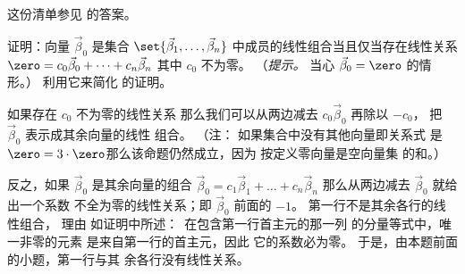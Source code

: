 \begin{exercises}
\begin{answer}
      这份清单参见  的答案。 
    \end{answer}
  \item  
     \begin{exparts}
          \partsitem 证明：向量 $\vec{\beta}_0$ 是集合 $\set{\vec{\beta}_1,\ldots,\vec{\beta}_n}$
            中成员的线性组合当且仅当存在线性关系 
            $\zero=c_0\vec{\beta}_0+\cdots+c_n\vec{\beta}_n$
            其中 $c_0$ 不为零。
            （\textit{提示。}   当心 $\vec{\beta}_0=\zero$ 的情形。）
          \partsitem 利用它来简化 
              的证明。   
       \end{exparts}
       \begin{answer}
          \begin{exparts}
           \partsitem 如果存在 $c_0$ 不为零的线性关系
             那么我们可以从两边减去 $c_0\vec{\beta}_0$ 再除以 $-c_0$，
             把 $\vec{\beta}_0$ 表示成其余向量的线性
             组合。
             （注：  
             如果集合中没有其他向量\Dash 即关系式
             是 $\zero=3\cdot\zero$\Dash 那么该命题仍然成立，因为
             按定义零向量是空向量集 
             的和。）

             反之，如果 $\vec{\beta}_0$ 是其余向量的组合 
             $\vec{\beta}_0=c_1\vec{\beta}_1+\dots+c_n\vec{\beta}_n$
             那么从两边减去
             $\vec{\beta}_0$ 就给出一个系数
             不全为零的线性关系；即
             $\vec{\beta}_0$ 前面的 $-1$。
           \partsitem 第一行不是其余各行的线性组合，
             理由
             如证明中所述：~在包含第一行首主元的那一列
             的分量等式中，唯一非零的元素
             是来自第一行的首主元，因此
             它的系数必为零。
             于是，由本题前面的小题，第一行与其
             余各行没有线性关系。


\end{exparts}
\end{answer}
\end{exercises}

